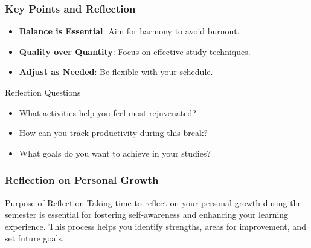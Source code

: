 \documentclass[aspectratio=169]{beamer}
\begin{document}
\begin{frame}[fragile]
    \frametitle{Key Points and Reflection}
    \begin{itemize}
        \item \textbf{Balance is Essential}: Aim for harmony to avoid burnout.
        \item \textbf{Quality over Quantity}: Focus on effective study techniques.
        \item \textbf{Adjust as Needed}: Be flexible with your schedule.
    \end{itemize}

    \begin{block}{Reflection Questions}
        \begin{itemize}
            \item What activities help you feel most rejuvenated?
            \item How can you track productivity during this break?
            \item What goals do you want to achieve in your studies?
        \end{itemize}
    \end{block}
\end{frame}

\begin{frame}[fragile]
    \frametitle{Reflection on Personal Growth}
    \begin{block}{Purpose of Reflection}
        Taking time to reflect on your personal growth during the semester is essential for fostering self-awareness and enhancing your learning experience. This process helps you identify strengths, areas for improvement, and set future goals.
    \end{block}
\end{frame}
\end{document}
